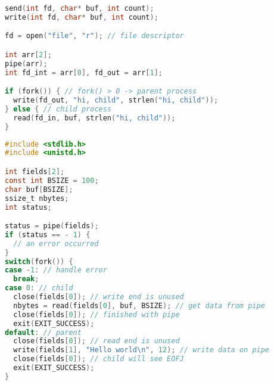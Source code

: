 \documentclass{article}
\begin{document}
\begin{lstlisting}[language=C]
send(int fd, char* buf, int count);
write(int fd, char* buf, int count);

fd = open("file", "r"); // file descriptor

int arr[2];
pipe(arr);
int fd_int = arr[0], fd_out = arr[1];

if (fork()) { // fork() > 0 -> parent process
  write(fd_out, "hi, child", strlen("hi, child"));
} else { // child process
  read(fd_in, buf, strlen("hi, child"));
}
\end{lstlisting}

\begin{lstlisting}[language=C]
#include <stdlib.h>
#include <unistd.h>

int fields[2];
const int BSIZE = 100;
char buf[BSIZE];
ssize_t nbytes;
int status; 

status = pipe(fields);
if (status == - 1) {
  // an error occurred
}
switch(fork()) {
case -1: // handle error
  break;
case 0: // child 
  close(fields[0]); // write end is unused
  nbytes = read(fields[0], buf, BSIZE); // get data from pipe
  close(fields[0]); // finished with pipe
  exit(EXIT_SUCCESS);
default: // parent
  close(fields[0]); // read end is unused
  write(fields[1], "Hello world\n", 12); // write data on pipe
  close(fields[0]); // child will see EOFJ
  exit(EXIT_SUCCESS);
}
\end{lstlisting}
\end{document}
